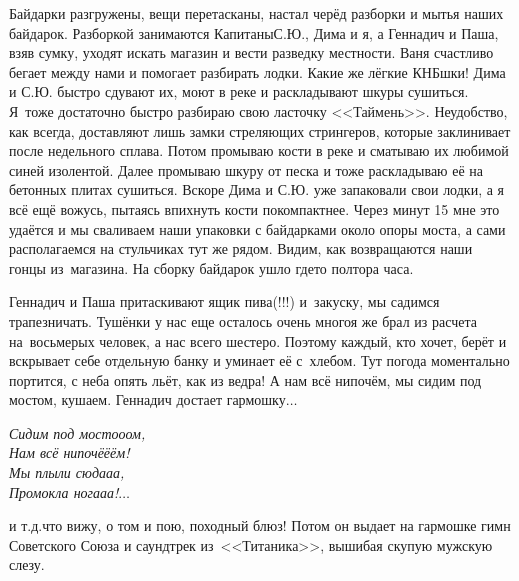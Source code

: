 \newpage
Байдарки разгружены, вещи перетасканы, настал черёд разборки и мытья наших байдарок. Разборкой занимаются Капитаны\mdash С.Ю., Дима и я, а Геннадич и Паша, взяв сумку, уходят искать магазин и вести разведку местности. Ваня счастливо бегает между нами и помогает разбирать лодки. Какие же лёгкие КНБ\sdash шки! Дима и С.Ю. быстро сдувают их, моют в реке и раскладывают шкуры сушиться. Я~тоже достаточно быстро разбираю свою ласточку <<Таймень>>. Неудобство, как всегда, доставляют лишь замки стреляющих стрингеров, которые заклинивает после недельного сплава. Потом промываю кости в реке и сматываю их любимой синей изолентой. Далее промываю шкуру от песка и тоже раскладываю её на бетонных плитах сушиться. Вскоре Дима и С.Ю. уже запаковали свои лодки, а я всё ещё вожусь, пытаясь впихнуть кости покомпактнее. Через минут 15 мне это удаётся и мы сваливаем наши упаковки с байдарками около опоры моста, а сами располагаемся на стульчиках тут же рядом. Видим, как возвращаются наши гонцы из~магазина. На сборку байдарок ушло где\sdash то полтора часа.

Геннадич и Паша притаскивают ящик пива(!!!) и~закуску, мы садимся трапезничать. Тушёнки у нас еще осталось очень много\mdash я же брал из расчета на~восьмерых человек, а нас всего шестеро. Поэтому каждый, кто хочет, берёт и вскрывает себе отдельную банку и уминает её с~хлебом. Тут погода моментально портится, с неба опять льёт, как из ведра! А нам всё нипочём, мы сидим под мостом, кушаем. Геннадич достает гармошку$\ldots$ %

\vspace{0.4cm}
\noindent\textit{%
\hspace*{3.5cm}Сидим под мосто\sdash о\sdash ом,\\
\hspace*{3.5cm}Нам всё нипочё\sdash ё\sdash ём!\\
\hspace*{3.5cm}Мы плыли сюда\sdash а\sdash а,\\ 
\hspace*{3.5cm}Промокла нога\sdash а\sdash а!$\ldots$ 
}

\newpage
\noindent и т.д.\mdash что вижу, о том и пою, походный блюз! Потом он выдает на гармошке гимн Советского Союза и саундтрек из~<<Титаника>>, вышибая скупую мужскую слезу. 

